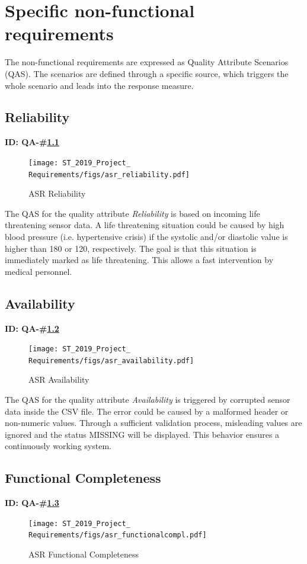 \documentclass[a4paper]{article}
\begin{document}
\clearpage
\section{Specific non-functional requirements}
\label{sec:non-func-req}
The non-functional requirements are expressed as Quality Attribute Scenarios (QAS). The scenarios are defined through a specific source, which triggers the whole scenario and leads into the response measure.

\subsection{Reliability}
\label{qa:reliability}
\textbf{ID: QA-\#\ref{qa:reliability}}
\begin{figure}[H]
\centering
    \texttt{[image: ST\_2019\_Project\_ Requirements/figs/asr\_reliability.pdf]}
    \caption{ASR Reliability}
    \label{fig:asr-reliability}
\end{figure}

The QAS for the quality attribute \textit{Reliability} is based on incoming life threatening sensor data. A life threatening situation could be caused by high blood pressure (i.e. hypertensive crisis) if the systolic and/or diastolic value is higher than 180 or 120, respectively. The goal is that this situation is immediately marked as life threatening. This allows a fast intervention by medical personnel. 

\subsection{Availability}
\label{qa:availability}
\textbf{ID: QA-\#\ref{qa:availability}}
\begin{figure}[H]
\centering
    \texttt{[image: ST\_2019\_Project\_ Requirements/figs/asr\_availability.pdf]}
    \caption{ASR Availability}
    \label{fig:asr-availability}
\end{figure}

The QAS for the quality attribute \textit{Availability} is triggered by corrupted sensor data inside the CSV file. The error could be caused by a malformed header or non-numeric values. Through a sufficient validation process, misleading values are ignored and the status MISSING will be displayed. This behavior ensures a continuously working system.

\clearpage
\subsection{Functional Completeness}
\label{qa:functionalcompl}
\textbf{ID: QA-\#\ref{qa:functionalcompl}}
\begin{figure}[H]
\centering
    \texttt{[image: ST\_2019\_Project\_ Requirements/figs/asr\_functionalcompl.pdf]}
    \caption{ASR Functional Completeness}
    \label{fig:asr-functionalcompl}
\end{figure}
\end{document}
